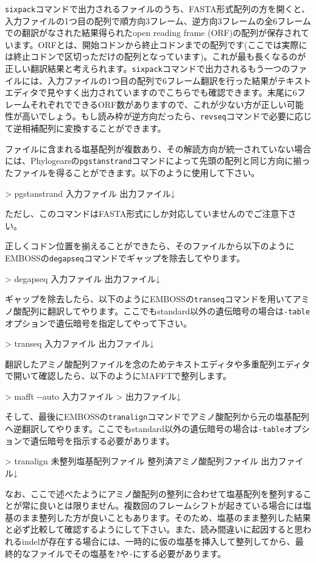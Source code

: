 \documentclass[titlepage,10pt,a4paper]{jsbook}
\newenvironment{cmd}{\begin{oframed}\raggedright\ttfamily\footnotesize\setlength{\baselineskip}{1.4em}}{\end{oframed}\vspace{-1em}}
\begin{document}
\texttt{sixpack}コマンドで出力されるファイルのうち、FASTA形式配列の方を開くと、入力ファイルの1つ目の配列で順方向3フレーム、逆方向3フレームの全6フレームでの翻訳がなされた結果得られたopen reading frame (ORF)の配列が保存されています。ORFとは、開始コドンから終止コドンまでの配列です(ここでは実際には終止コドンで区切っただけの配列となっています)。これが最も長くなるのが正しい翻訳結果と考えられます。\texttt{sixpack}コマンドで出力されるもう一つのファイルには、入力ファイルの1つ目の配列で6フレーム翻訳を行った結果がテキストエディタで見やすく出力されていますのでこちらでも確認できます。末尾に6フレームそれぞれでできるORF数がありますので、これが少ない方が正しい可能性が高いでしょう。もし読み枠が逆方向だったら、\texttt{revseq}コマンドで必要に応じて逆相補配列に変換することができます。

ファイルに含まれる塩基配列が複数あり、その解読方向が統一されていない場合には、Phylogearsの\texttt{pgstanstrand}コマンドによって先頭の配列と同じ方向に揃ったファイルを得ることができます。以下のように使用して下さい。
\begin{cmd}
{\textgreater} pgstanstrand 入力ファイル 出力ファイル↓
\end{cmd}
ただし、このコマンドはFASTA形式にしか対応していませんのでご注意下さい。

正しくコドン位置を揃えることができたら、そのファイルから以下のようにEMBOSSの\texttt{degapseq}コマンドでギャップを除去してやります。
\begin{cmd}
{\textgreater} degapseq 入力ファイル 出力ファイル↓
\end{cmd}
ギャップを除去したら、以下のようにEMBOSSの\texttt{transeq}コマンドを用いてアミノ酸配列に翻訳してやります。ここでもstandard以外の遺伝暗号の場合は\texttt{-table}オプションで遺伝暗号を指定してやって下さい。
\begin{cmd}
{\textgreater} transeq 入力ファイル 出力ファイル↓
\end{cmd}
翻訳したアミノ酸配列ファイルを念のためテキストエディタや多重配列エディタで開いて確認したら、以下のようにMAFFTで整列します。
\begin{cmd}
{\textgreater} mafft {-}{-}auto 入力ファイル > 出力ファイル↓
\end{cmd}
そして、最後にEMBOSSの\texttt{tranalign}コマンドでアミノ酸配列から元の塩基配列へ逆翻訳してやります。ここでもstandard以外の遺伝暗号の場合は\texttt{-table}オプションで遺伝暗号を指示する必要があります。
\begin{cmd}
{\textgreater} tranalign 未整列塩基配列ファイル 整列済アミノ酸配列ファイル 出力ファイル↓
\end{cmd}
なお、ここで述べたようにアミノ酸配列の整列に合わせて塩基配列を整列することが常に良いとは限りません。複数回のフレームシフトが起きている場合には塩基のまま整列した方が良いこともあります。そのため、塩基のまま整列した結果と必ず比較して確認するようにして下さい。また、読み間違いに起因すると思われるindelが存在する場合には、一時的に仮の塩基を挿入して整列してから、最終的なファイルでその塩基を\texttt{?}や\texttt{-}にする必要があります。
\end{document}
